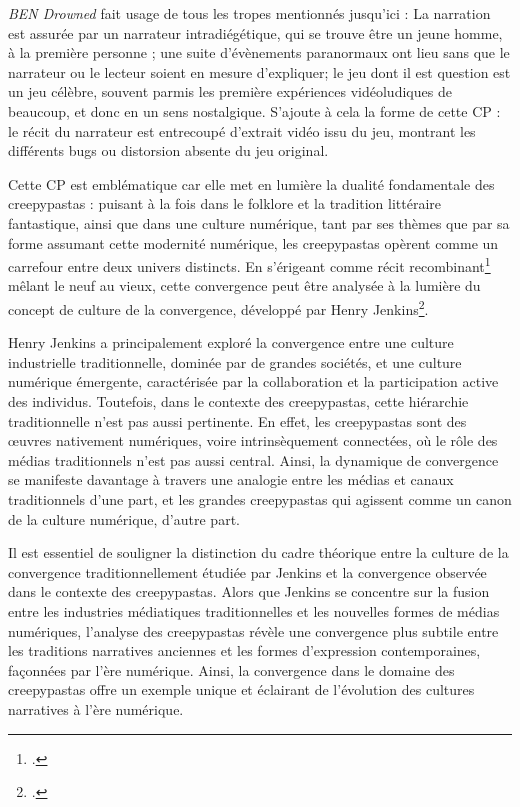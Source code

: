 \documentclass[12pt,a4paper,oneside,titlepage]{article} %
\begin{document}
\emph{BEN Drowned} fait usage de tous les tropes mentionnés jusqu'ici : La narration est assurée par un narrateur intradiégétique, qui se trouve être un jeune homme, à la première personne ;  une suite d'évènements paranormaux ont lieu sans que le narrateur ou le lecteur soient en mesure d'expliquer; le jeu dont il est question est un jeu célèbre, souvent parmis les première expériences vidéoludiques de beaucoup, et donc en un sens nostalgique.
S'ajoute à cela la forme de cette CP : le récit du narrateur est entrecoupé d'extrait vidéo issu du jeu, montrant les différents bugs ou distorsion absente du jeu original.

Cette CP est emblématique car elle met en lumière la dualité fondamentale des creepypastas : puisant à la fois dans le folklore et la tradition littéraire fantastique, ainsi que dans une culture numérique, tant par ses thèmes que par sa forme assumant cette modernité numérique, les creepypastas opèrent comme un carrefour entre deux univers distincts. En s'érigeant comme récit recombinant\footcite{jacobs_character_1990} mêlant le neuf au vieux, cette convergence peut être analysée à la lumière du concept de culture de la convergence, développé par Henry Jenkins\footcite{jenkins_convergence_2006}.

Henry Jenkins a principalement exploré la convergence entre une culture industrielle traditionnelle, dominée par de grandes sociétés, et une culture numérique émergente, caractérisée par la collaboration et la participation active des individus. Toutefois, dans le contexte des creepypastas, cette hiérarchie traditionnelle n'est pas aussi pertinente. En effet, les creepypastas sont des œuvres nativement numériques, voire intrinsèquement connectées, où le rôle des médias traditionnels n'est pas aussi central. Ainsi, la dynamique de convergence se manifeste davantage à travers une analogie entre les médias et canaux traditionnels d'une part, et les grandes creepypastas qui agissent comme un canon de la culture numérique, d'autre part.

Il est essentiel de souligner la distinction du cadre théorique entre la culture de la convergence traditionnellement étudiée par Jenkins et la convergence observée dans le contexte des creepypastas. Alors que Jenkins se concentre sur la fusion entre les industries médiatiques traditionnelles et les nouvelles formes de médias numériques, l'analyse des creepypastas révèle une convergence plus subtile entre les traditions narratives anciennes et les formes d'expression contemporaines, façonnées par l'ère numérique. Ainsi, la convergence dans le domaine des creepypastas offre un exemple unique et éclairant de l'évolution des cultures narratives à l'ère numérique.
\end{document}
